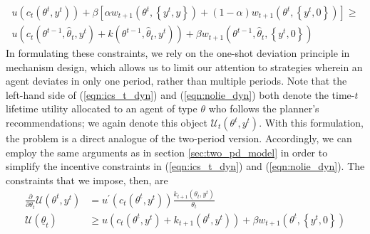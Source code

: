 \documentclass[11pt]{article}
\begin{document}
\begin{multline}
    u\left(c_{t}\left(\theta^{t},y^{t}\right)\right)+\beta\left[\alpha w_{t+1}\left(\theta^{t},\left\{ y^{t},y\right\} \right)+\left(1-\alpha\right)w_{t+1}\left(\theta^{t},\left\{ y^{t},0\right\} \right)\right]\ge \\
    u\left(c_{t}\left(\theta^{t-1},\hat{\theta}_{t},y^{t}\right)+k\left(\theta^{t-1},\hat{\theta}_{t},y^{t}\right)\right)+\beta w_{t+1}\left(\theta^{t-1},\hat{\theta}_{t},\left\{ y^{t},0\right\} \right) \label{eqn:nolie_dyn}
\end{multline}
In formulating these constraints, we rely on the one-shot deviation principle in mechanism design, which allows us to limit our attention to strategies wherein an agent deviates in only one period, rather than multiple periods. Note that the left-hand side of (\ref{eqn:ics_t_dyn}) and (\ref{eqn:nolie_dyn}) both denote the time-\( t \) lifetime utility allocated to an agent of type \( \theta \) who follows the planner's recommendations; we again denote this object \( \mathcal{U}_t\left( \theta^t,y^t \right) \). With this formulation, the problem is a direct analogue of the two-period version. Accordingly, we can employ the same arguments as in section \ref{sec:two_pd_model} in order to simplify the incentive constraints in (\ref{eqn:ics_t_dyn}) and (\ref{eqn:nolie_dyn}). The constraints that we impose, then, are 
\begin{align}
    \frac{\partial}{\partial\theta_{t}}\mathcal{U}\left(\theta^{t},y^{t}\right) &= u^{\prime}\left(c_{t}\left(\theta^{t},y^{t}\right)\right)\frac{k_{t+1}\left(\theta_{t},y^{t}\right)}{\theta_{t}} \label{eqn:ics_local_dyn} \\ 
    \mathcal{U}\left(\underline{\theta}_{t}\right) &\ge u\left(c_{t}\left(\theta^{t},y^{t} \right)+k_{t+1}\left(\theta^{t},y^{t}\right)\right)+\beta w_{t+1}\left(\theta^{t},\left\{ y^{t},0\right\} \right) \label{eqn:nolie_1_dyn}
\end{align}
\end{document}
